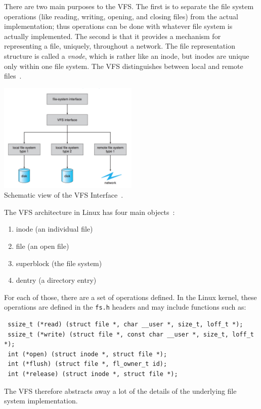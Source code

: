 There are two main purposes to the VFS. The first is to separate the file system operations (like reading, writing, opening, and closing files) from the actual implementation; thus operations can be done with whatever file system is actually implemented. The second is that it provides a mechanism for representing a file, uniquely, throughout a network. The file representation structure is called a \textit{vnode}, which is rather like an inode, but inodes are unique only within one file system. The VFS distinguishes between local and remote files~\cite{osc}.

\begin{center}
	\includegraphics[width=0.5\textwidth]{images/vfs.png}\\
	Schematic view of the VFS Interface~\cite{osc}.
\end{center}

The VFS architecture in Linux has four main objects~\cite{osc}:
\begin{enumerate}
	\item inode (an individual file)
	\item file (an open file)
	\item superblock (the file system)
	\item dentry (a directory entry)
\end{enumerate}

For each of those, there are a set of operations defined. In the Linux kernel, these operations are defined in the \texttt{fs.h} headers and may include functions such as:

\begin{verbatim}
 ssize_t (*read) (struct file *, char __user *, size_t, loff_t *);
 ssize_t (*write) (struct file *, const char __user *, size_t, loff_t *);
 int (*open) (struct inode *, struct file *);
 int (*flush) (struct file *, fl_owner_t id);
 int (*release) (struct inode *, struct file *);
\end{verbatim}

The VFS therefore abstracts away a lot of the details of the underlying file system implementation.

